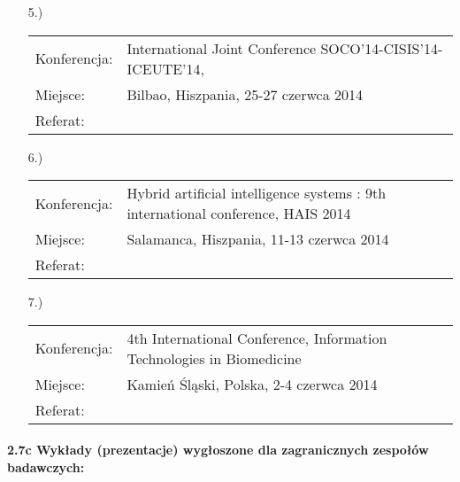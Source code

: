\begin{itemize}
	\item[5.)]~\\
	
	\begin{tabular}{p{7em}p{32.5em}}
	Konferencja:& International Joint Conference SOCO'14-CISIS'14-ICEUTE'14, \\
	Miejsce: & Bilbao, Hiszpania, 25-27 czerwca 2014\\
	Referat: & \textbf{\fullcite{Kra14b}}
	\end{tabular}

	\item[6.)]~\\
	
	\begin{tabular}{p{7em}p{32.5em}}
	Konferencja:& Hybrid artificial intelligence systems : 9th international conference, HAIS 2014\\
	Miejsce: & Salamanca, Hiszpania, 11-13 czerwca 2014\\
	Referat: & \textbf{\fullcite{Kra14a}}		
	\end{tabular}

	\item[7.)]~\\
	
	\begin{tabular}{p{7em}p{32.5em}}
	Konferencja:& 4th International Conference, Information Technologies in Biomedicine\\
	Miejsce: & Kamień Śląski, Polska, 2-4 czerwca 2014\\
	Referat: & \textbf{\fullcite{Jac14}}
	\end{tabular}	
\end{itemize}
\newpage
\paragraph{2.7c Wykłady (prezentacje) wygłoszone dla zagranicznych zespołów badawczych:}

